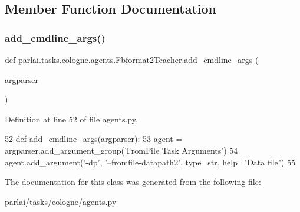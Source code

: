 \subsection{Member Function Documentation}
\mbox{\label{classparlai_1_1tasks_1_1cologne_1_1agents_1_1Fbformat2Teacher_a24dad9673eefe3890899cc9e5834c2c9}} 
\subsubsection{\texorpdfstring{add\+\_\+cmdline\+\_\+args()}{add\_cmdline\_args()}}
{\footnotesize\ttfamily def parlai.\+tasks.\+cologne.\+agents.\+Fbformat2\+Teacher.\+add\+\_\+cmdline\+\_\+args (\begin{DoxyParamCaption}\item[{}]{argparser }\end{DoxyParamCaption})\hspace{0.3cm}{\ttfamily [static]}}



Definition at line 52 of file agents.\+py.


\begin{DoxyCode}
52     \textcolor{keyword}{def }\hyperlink{namespaceparlai_1_1agents_1_1drqa_1_1config_a62fdd5554f1da6be0cba185271058320}{add\_cmdline\_args}(argparser):
53         agent = argparser.add\_argument\_group(\textcolor{stringliteral}{'FromFile Task Arguments'})
54         agent.add\_argument(\textcolor{stringliteral}{'-dp'}, \textcolor{stringliteral}{'--fromfile-datapath2'}, type=str, help=\textcolor{stringliteral}{"Data file"})
55 
\end{DoxyCode}


The documentation for this class was generated from the following file\+:\begin{DoxyCompactItemize}
\item 
parlai/tasks/cologne/\hyperlink{parlai_2tasks_2cologne_2agents_8py}{agents.\+py}\end{DoxyCompactItemize}
